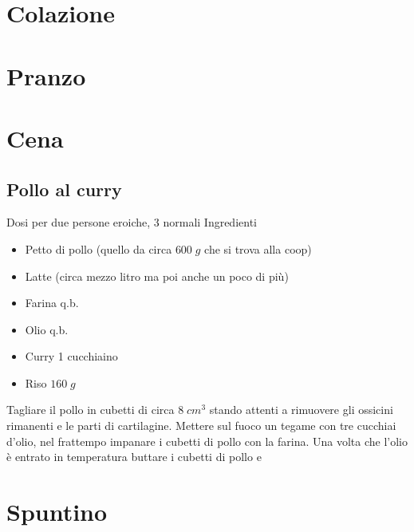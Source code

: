 \chapter{Colazione}
\section{}
\chapter{Pranzo}

\chapter{Cena}
\section{Pollo al curry}
Dosi per due persone eroiche, 3 normali
Ingredienti
\begin{itemize}
\item Petto di pollo (quello da circa $600 \; g$ che si trova alla coop)
\item Latte (circa mezzo litro ma poi anche un poco di più)
\item Farina q.b.
\item Olio q.b.
\item Curry 1 cucchiaino
\item Riso $160 \; g$
\end{itemize}
Tagliare il pollo in cubetti di circa $8 \; cm^3$ stando attenti a rimuovere gli ossicini rimanenti e le parti di cartilagine. Mettere sul fuoco un tegame con tre cucchiai d'olio, nel frattempo impanare i cubetti di pollo con la farina. Una volta che l'olio è entrato in temperatura buttare i cubetti di pollo e

\chapter{Spuntino}

\pagebreak